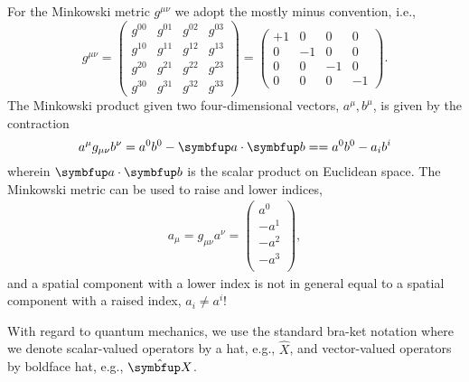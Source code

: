 For the Minkowski metric $g^{\mu\nu}$ we adopt the mostly minus convention, i.e.,
\begin{equation*}
	g^{\mu\nu}
	=
	\begin{pmatrix}
		g^{00} & g^{01} & g^{02} & g^{03} \\
		g^{10} & g^{11} & g^{12} & g^{13} \\
		g^{20} & g^{21} & g^{22} & g^{23} \\
		g^{30} & g^{31} & g^{32} & g^{33}
	\end{pmatrix}
	=
	\begin{pmatrix}
		+1 & 0 & 0 & 0 \\
		0 & -1 & 0 & 0 \\
		0 & 0 & -1 & 0 \\
		0 & 0 & 0 & -1
	\end{pmatrix}
	.
\end{equation*}
The Minkowski product given two four-dimensional vectors, $a^\mu,b^\mu$, is given by the contraction
\begin{equation*}
	a^\mu g_{\mu\nu} b^\nu
	=
	a^0 b^0
	-
	\vb{a}\vdot\vb{b}
	=
	=
	a^0 b^0
	-
	a_i b^i
\end{equation*}
wherein $\vb{a}\vdot\vb{b}$ is the scalar product on Euclidean space.
The Minkowski metric can be used to raise and lower indices,
\begin{align*}
	a_\mu
	=
	g_{\mu\nu}
	a^\nu
	=
	\begin{pmatrix}
		a^0 \\
		-a^1 \\
		-a^2 \\
		-a^3 \\
	\end{pmatrix}
	,
\end{align*}
and a spatial component with a lower index is not in general equal to a spatial component with a raised index, $a_i\neq a^i$!

With regard to quantum mechanics, we use the standard bra-ket notation where we denote scalar-valued operators by a hat, e.g., $\hat{X}$, and vector-valued operators by boldface hat, e.g., $\vu{X}$.